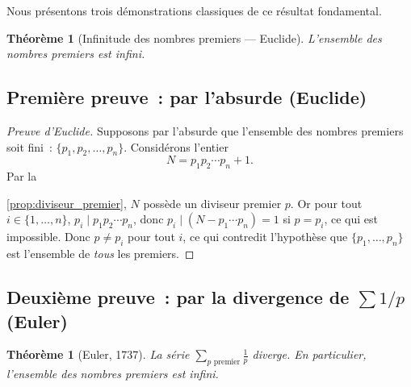 \documentclass[12pt,a4paper,openany]{book}
\theoremstyle{definition}
\theoremstyle{plain}
\newtheorem{theoreme}[definition]{Théorème}
\theoremstyle{remark}
\begin{document}

Nous présentons trois démonstrations classiques de ce résultat fondamental.

\begin{theoreme}[Infinitude des nombres premiers --- Euclide]
\label{thm:euclide_infinite}
L'ensemble des nombres premiers est infini.
\end{theoreme}

\subsection{Première preuve~: par l'absurde (Euclide)}
\label{subsec:ch2:preuve1}

\begin{proof}[Preuve d'Euclide]
Supposons par l'absurde que l'ensemble des nombres premiers soit fini~:
$\{p_1, p_2, \ldots, p_n\}$. Considérons l'entier
\[
  N = p_1 p_2 \cdots p_n + 1.
\]
Par la 





\ref{prop:diviseur_premier}, $N$ possède un diviseur premier $p$. Or pour
tout $i \in \{1, \ldots, n\}$, $p_i \mid p_1 p_2 \cdots p_n$, donc
$p_i \mid (N - p_1 \cdots p_n) = 1$ si $p = p_i$, ce qui est impossible. Donc
$p \neq p_i$ pour tout $i$, ce qui contredit l'hypothèse que $\{p_1, \ldots, p_n\}$
est l'ensemble de \emph{tous} les premiers.
\end{proof}

\subsection{Deuxième preuve~: par la divergence de $\sum 1/p$ (Euler)}
\label{subsec:ch2:preuve2}


\begin{theoreme}[Euler, 1737]
\label{thm:euler_divergence}
La série $\displaystyle\sum_{p \text{ premier}} \frac{1}{p}$ diverge.
En particulier, l'ensemble des nombres premiers est infini.
\end{theoreme}
\end{document}
